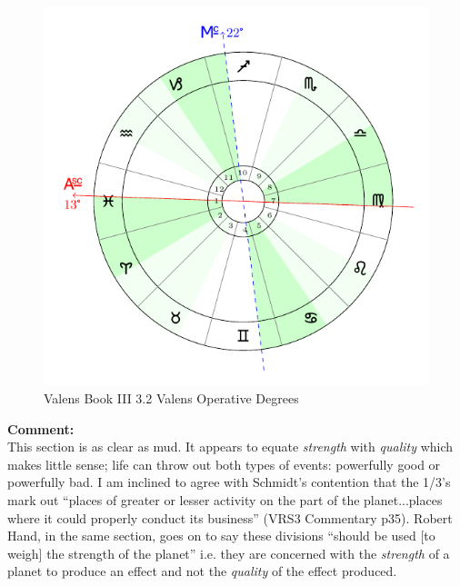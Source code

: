 \begin{figure}[H]
\includegraphics[width=\textwidth]{charts/3_02_Valens_opdegs}
\caption{Valens Book III 3.2 Valens Operative Degrees}
\end{figure}

\begin{mdframed}[backgroundcolor=cyan!5]
\textbf{Comment:} \hfill \\
This section is as clear as mud. It appears to equate \textsl{strength} with \textsl{quality} which makes little sense; life can throw out both types of events: powerfully good or powerfully bad. I am inclined to agree with Schmidt's contention that the 1/3's mark out ``places of greater or lesser activity on the part of the planet...places where it could properly conduct its business'' (VRS3 Commentary p35). Robert Hand, in the same section, goes on to say these divisions ``should be used [to weigh] the strength of the planet'' i.e. they are concerned with the \textsl{strength} of a planet to produce an effect and not the \textsl{quality} of the effect produced.
\end{mdframed}

\newpage